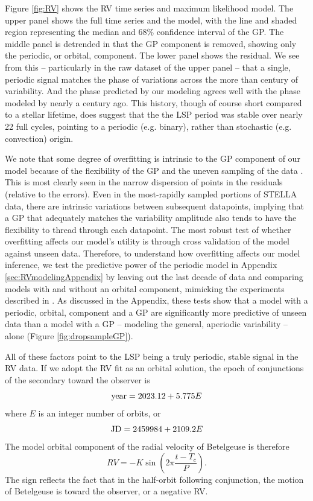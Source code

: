 \documentclass[twocolumn]{aastex631}
\begin{document}
Figure \ref{fig:RV} shows the RV time series and maximum likelihood model. The upper panel shows the full time series and the model, with the line and shaded region representing the median and 68\% confidence interval of the GP. The middle panel is detrended in that the GP component is removed, showing only the periodic, or orbital, component. The lower panel shows the residual. We see from this -- particularly in the raw dataset of the upper panel -- that a single, periodic signal matches the phase of variations across the more than century of variability. And the phase predicted by our modeling agrees well with the phase modeled by \citet{1928MNRAS..88..660S} nearly a century ago. This history, though of course short compared to a stellar lifetime, does suggest that the the LSP period was stable over nearly 22 full cycles, pointing to a periodic (e.g. binary), rather than stochastic (e.g. convection) origin. 


We note that some degree of overfitting is intrinsic to the GP component of our model because of the flexibility of the GP and the uneven sampling of the data \citep{2023AJ....166...62B}. This is most clearly seen in the narrow dispersion of points in the residuals (relative to the errors). Even in the most-rapidly sampled portions of STELLA data, there are intrinsic variations between subsequent datapoints, implying that a GP that adequately matches the variability amplitude also tends to have the flexibility to thread through each datapoint. The most robust test of whether overfitting affects our model's utility is through cross validation of the model against unseen data. Therefore, to understand how overfitting affects our model inference, we test the predictive power of the periodic model in Appendix \ref{sec:RVmodelingAppendix} by leaving out the last decade of data and comparing models with and without an orbital component, mimicking the experiments described in \citet{2023AJ....166...62B}. As discussed in the Appendix, these tests show that a model with a periodic, orbital, component and a GP are significantly more predictive of unseen data than a model with a GP -- modeling the general, aperiodic variability -- alone (Figure \ref{fig:dropsampleGP}). 

All of these factors point to the LSP being a truly periodic, stable signal in the RV data.  If we adopt the RV fit as an orbital solution, the epoch of conjunctions of the secondary toward the observer is
\begin{equation}\label{RVephemeris}
    {\rm year} = 2023.12 + 5.775 E
\end{equation}
where $E$ is an integer number of orbits, or 
\begin{equation}
    {\rm JD} = 2459984 + 2109.2 E
\end{equation}
The model orbital component of the radial velocity of Betelgeuse is therefore
\begin{equation}\label{RVformula}
    RV =  - K \sin \left( 2\pi \frac{t-T_c }{P}  \right). 
\end{equation}
The sign reflects the fact that in the half-orbit following conjunction, the motion of Betelgeuse is toward the observer, or a negative RV. 
\end{document}
